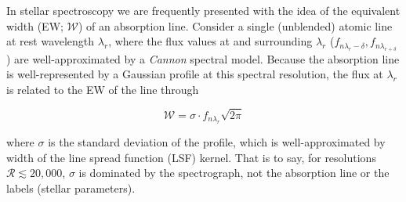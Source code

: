 \documentclass[useAMS,usenatbib]{mn2e}
\newcommand\tc{\textit{The Cannon}}
\newcommand\lv{\mathbf{\boldsymbol\ell_n}}
\newcommand\cv{{\boldsymbol\theta}_\lambda}
\begin{document}
In stellar spectroscopy we are frequently presented with the idea of the equivalent width (EW; $\mathcal{W}$) of an absorption line. Consider a single (unblended) atomic line at rest wavelength $\lambda_r$, where the flux values at and surrounding $\lambda_r$ ($f_{n\lambda_r-{\delta}},f_{n\lambda_{r+\delta}}$) are well-approximated by a \textit{Cannon} spectral model. Because the absorption line is well-represented by a Gaussian profile at this spectral resolution, the flux at $\lambda_r$ is related to the EW of the line through

\begin{equation}
\mathcal{W} = \sigma\cdot{}f_{n\lambda_r}\sqrt{2\pi}
\end{equation}

where $\sigma$ is the standard deviation of the profile, which is well-approximated by width of the line spread function (LSF) kernel. That is to say, for resolutions $\mathcal{R} \lesssim 20,000$, $\sigma$ is dominated by the spectrograph, not the absorption line or the labels (stellar parameters).

















%


\end{document}
